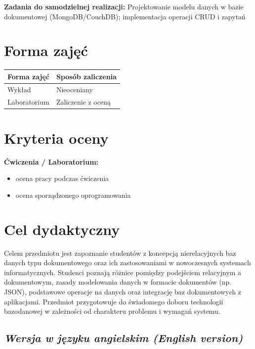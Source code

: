 \documentclass[12pt, a4paper]{article}
\newcommand{\thdrule}{\noalign{\global\setlength{\extrarowheight}{0pt}}}
\newcommand{\thdend}{\noalign{\global\setlength{\extrarowheight}{3pt}}}
\begin{document}
\vspace{4pt}
\noindent\textbf{Zadania do samodzielnej realizacji:} Projektowanie modelu danych w bazie dokumentowej (MongoDB/CouchDB); implementacja operacji CRUD i zapytań

\section{Forma zajęć}

\begin{center}
{\scriptsize
\begin{tabular}{m{5cm}m{8cm}}
\thdrule\toprule
\rowcolor{pjatkRed} {\color{white}\textbf{Forma zajęć}} & {\color{white}\textbf{Sposób zaliczenia}} \\
\midrule\thdend
  \rowcolor{tableRowLight} Wykład & Nieoceniany \\
  \rowcolor{tableRowAlt} Laboratorium & Zaliczenie z oceną \\
\bottomrule
\end{tabular}}
\end{center}

\section{Kryteria oceny}

\textbf{Ćwiczenia / Laboratorium:}
\begin{itemize}
  \item ocena pracy podczas ćwiczenia
  \item ocena sporządzonego oprogramowania
\end{itemize}


\section{Cel dydaktyczny}

Celem przedmiotu jest zapoznanie studentów z koncepcją nierelacyjnych baz danych typu dokumentowego oraz ich zastosowaniami w nowoczesnych systemach informatycznych. Studenci poznają różnice pomiędzy podejściem relacyjnym a dokumentowym, zasady modelowania danych w formacie dokumentów (np. JSON), podstawowe operacje na danych oraz integrację baz dokumentowych z aplikacjami. Przedmiot przygotowuje do świadomego doboru technologii bazodanowej w zależności od charakteru problemu i wymagań systemu.

\subsection*{\textit{Wersja w języku angielskim (English version)}}
\end{document}
